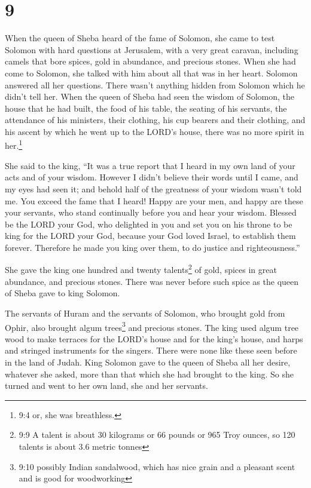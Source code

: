 \hypertarget{section-8}{%
\section{9}\label{section-8}}

 When the queen of Sheba heard of the fame of Solomon, she
came to test Solomon with hard questions at Jerusalem, with a very great
caravan, including camels that bore spices, gold in abundance, and
precious stones. When she had come to Solomon, she talked with him about
all that was in her heart.  Solomon answered all her
questions. There wasn't anything hidden from Solomon which he didn't
tell her.  When the queen of Sheba had seen the wisdom of
Solomon, the house that he had built,  the food of his
table, the seating of his servants, the attendance of his ministers,
their clothing, his cup bearers and their clothing, and his ascent by
which he went up to the LORD's house, there was no more spirit in
her.\footnote{9:4 or, she was breathless.}

 She said to the king, ``It was a true report that I heard
in my own land of your acts and of your wisdom.  However I
didn't believe their words until I came, and my eyes had seen it; and
behold half of the greatness of your wisdom wasn't told me. You exceed
the fame that I heard!  Happy are your men, and happy are
these your servants, who stand continually before you and hear your
wisdom.  Blessed be the LORD your God, who delighted in you
and set you on his throne to be king for the LORD your God, because your
God loved Israel, to establish them forever. Therefore he made you king
over them, to do justice and righteousness.''

 She gave the king one hundred and twenty talents\footnote{9:9
  A talent is about 30 kilograms or 66 pounds or 965 Troy ounces, so 120
  talents is about 3.6 metric tonnes} of gold, spices in great
abundance, and precious stones. There was never before such spice as the
queen of Sheba gave to king Solomon.

 The servants of Huram and the servants of Solomon, who
brought gold from Ophir, also brought algum trees\footnote{9:10 possibly
  Indian sandalwood, which has nice grain and a pleasant scent and is
  good for woodworking} and precious stones.  The king used
algum tree wood to make terraces for the LORD's house and for the king's
house, and harps and stringed instruments for the singers. There were
none like these seen before in the land of Judah.  King
Solomon gave to the queen of Sheba all her desire, whatever she asked,
more than that which she had brought to the king. So she turned and went
to her own land, she and her servants.

